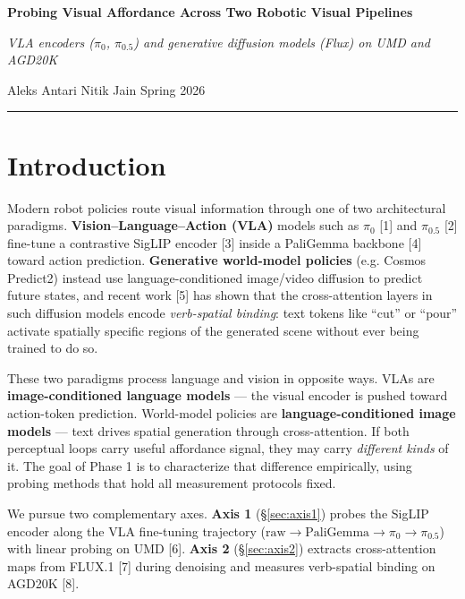 \documentclass[11pt,letterpaper]{article}
\begin{document}
\begin{center}
  {\Large\bfseries\color{HeadColor} Probing Visual Affordance Across Two Robotic Visual Pipelines}\par
  \vspace{2pt}
  {\itshape\color{MutedColor}\normalsize VLA encoders ($\pi_0$, $\pi_{0.5}$) and generative diffusion models (Flux) on UMD and AGD20K}\par
  \vspace{4pt}
  {\color{AccentColor}\small Aleks Antari \quad\textperiodcentered\quad Nitik Jain \quad\textperiodcentered\quad Spring 2026}\par
\end{center}
\vspace{-4pt}
\noindent\textcolor{AccentColor}{\rule{\linewidth}{0.5pt}}
\vspace{-2pt}

\section{Introduction}

Modern robot policies route visual information through one of two architectural paradigms. \textbf{Vision–Language–Action (VLA)} models such as $\pi_0$ [1] and $\pi_{0.5}$ [2] fine-tune a contrastive SigLIP encoder [3] inside a PaliGemma backbone [4] toward action prediction. \textbf{Generative world-model policies} (e.g. Cosmos Predict2) instead use language-conditioned image/video diffusion to predict future states, and recent work [5] has shown that the cross-attention layers in such diffusion models encode \emph{verb-spatial binding}: text tokens like ``cut'' or ``pour'' activate spatially specific regions of the generated scene without ever being trained to do so.

These two paradigms process language and vision in opposite ways. VLAs are \textbf{image-conditioned language models} --- the visual encoder is pushed toward action-token prediction. World-model policies are \textbf{language-conditioned image models} --- text drives spatial generation through cross-attention. If both perceptual loops carry useful affordance signal, they may carry \emph{different kinds} of it. The goal of Phase 1 is to characterize that difference empirically, using probing methods that hold all measurement protocols fixed.

We pursue two complementary axes. \textbf{Axis 1} (\S\ref{sec:axis1}) probes the SigLIP encoder along the VLA fine-tuning trajectory ($\text{raw}\to\text{PaliGemma}\to\pi_0\to\pi_{0.5}$) with linear probing on UMD [6]. \textbf{Axis 2} (\S\ref{sec:axis2}) extracts cross-attention maps from FLUX.1 [7] during denoising and measures verb-spatial binding on AGD20K [8].
\end{document}
